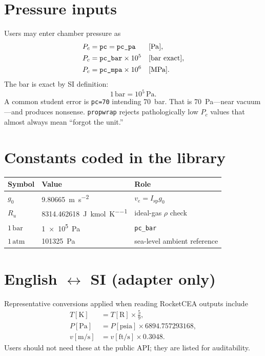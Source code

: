 \documentclass[11pt,a4paper]{report}
\newcommand{\pw}{\texttt{propwrap}}
\newcommand{\Isp}{I_{\mathrm{sp}}}
\newcommand{\ve}{v_{e}}
\newcommand{\Pc}{P_{c}}
\newcommand{\gzero}{g_{0}}
\begin{document}
\section{Pressure inputs}

Users may enter chamber pressure as
\begin{align}
  \Pc &= \texttt{pc} = \texttt{pc\_pa} && \text{[\si{\pascal}]},\\
  \Pc &= \texttt{pc\_bar}\times 10^{5} && \text{[bar exact]},\\
  \Pc &= \texttt{pc\_mpa}\times 10^{6} && \text{[MPa]}.
\end{align}
The bar is exact by SI definition:
\begin{equation}
  1\,\mathrm{bar} = 10^{5}\,\mathrm{Pa}.
  \label{eq:bar}
\end{equation}
A common student error is \texttt{pc=70} intending 70~bar. That is 70~Pa---near
vacuum---and produces nonsense. \pw{} rejects pathologically low $\Pc$ values
that almost always mean ``forgot the unit.''

\section{Constants coded in the library}

\begin{center}
\begin{tabular}{@{}lll@{}}
\toprule
Symbol & Value & Role \\
\midrule
$\gzero$ & \SI{9.80665}{\metre\per\second\squared} & $\ve=\Isp\gzero$ \\
$R_u$ & \SI{8314.462618}{\joule\per\kilo\mole\per\kelvin} & ideal-gas $\rho$ check \\
$1\,\mathrm{bar}$ & \SI{1e5}{\pascal} & \texttt{pc\_bar} \\
$1\,\mathrm{atm}$ & \SI{101325}{\pascal} & sea-level ambient reference \\
\bottomrule
\end{tabular}
\end{center}

\section{English $\leftrightarrow$ SI (adapter only)}

Representative conversions applied when reading RocketCEA outputs include
\begin{align}
  T[\mathrm{K}] &= T[\mathrm{R}]\times\frac{5}{9},\\
  P[\mathrm{Pa}] &= P[\mathrm{psia}]\times 6894.757293168,\\
  v[\mathrm{m/s}] &= v[\mathrm{ft/s}]\times 0.3048.
\end{align}
Users should not need these at the public API; they are listed for auditability.
\end{document}
